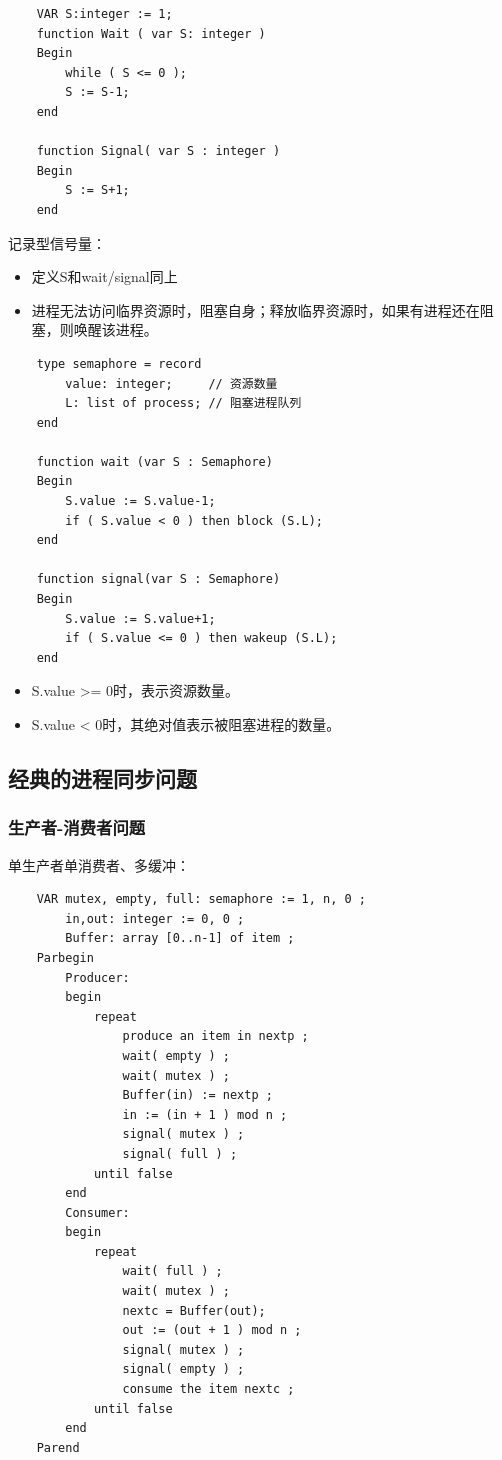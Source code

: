 \documentclass[12pt, a4paper, oneside]{ctexart}
\begin{document}
\begin{lstlisting}
    VAR S:integer := 1;
    function Wait ( var S: integer )
    Begin
        while ( S <= 0 );
        S := S-1;
    end

    function Signal( var S : integer )
    Begin
        S := S+1;
    end
\end{lstlisting}

记录型信号量：
\begin{itemize}
    \item 定义S和wait/signal同上
    \item 进程无法访问临界资源时，阻塞自身；释放临界资源时，如果有进程还在阻塞，则唤醒该进程。
\end{itemize}

\begin{lstlisting}
    type semaphore = record
        value: integer;     // 资源数量
        L: list of process; // 阻塞进程队列
    end

    function wait (var S : Semaphore)
    Begin
        S.value := S.value-1;
        if ( S.value < 0 ) then block (S.L);
    end

    function signal(var S : Semaphore)
    Begin
        S.value := S.value+1;
        if ( S.value <= 0 ) then wakeup (S.L);
    end
\end{lstlisting}

\begin{itemize}
    \item S.value >= 0时，表示资源数量。
    \item S.value < 0时，其绝对值表示被阻塞进程的数量。
\end{itemize}

\subsection{经典的进程同步问题}

\subsubsection{生产者-消费者问题}

单生产者单消费者、多缓冲：
\begin{lstlisting}
    VAR mutex, empty, full: semaphore := 1, n, 0 ;
        in,out: integer := 0, 0 ;
        Buffer: array [0..n-1] of item ;
    Parbegin
        Producer:
        begin
            repeat
                produce an item in nextp ;
                wait( empty ) ;
                wait( mutex ) ;
                Buffer(in) := nextp ;
                in := (in + 1 ) mod n ;
                signal( mutex ) ;
                signal( full ) ;
            until false
        end
        Consumer:
        begin
            repeat
                wait( full ) ;
                wait( mutex ) ;
                nextc = Buffer(out);
                out := (out + 1 ) mod n ;
                signal( mutex ) ;
                signal( empty ) ;
                consume the item nextc ;
            until false
        end
    Parend
\end{lstlisting}
\end{document}
